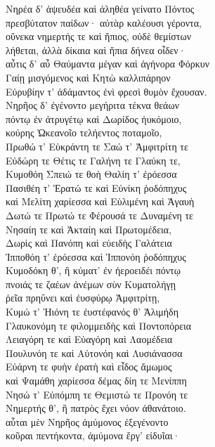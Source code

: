 \begin{pages}
\begin{Leftside}
Νηρέα δ' ἀψευδέα καὶ ἀληθέα γείνατο Πόντος \\
πρεσβύτατον παίδων· αὐτὰρ καλέουσι γέροντα, \\
οὕνεκα νημερτής τε καὶ ἤπιος, οὐδὲ θεμίστων \\
λήθεται, ἀλλὰ δίκαια καὶ ἤπια δήνεα οἶδεν· \\
αὖτις δ' αὖ Θαύμαντα μέγαν καὶ ἀγήνορα Φόρκυν\\
Γαίῃ μισγόμενος καὶ Κητὼ καλλιπάρηον \\
Εὐρυβίην τ' ἀδάμαντος ἐνὶ φρεσὶ θυμὸν ἔχουσαν.\\
Νηρῆος δ' ἐγένοντο μεγήριτα τέκνα θεάων \\
πόντῳ ἐν ἀτρυγέτῳ καὶ Δωρίδος ἠυκόμοιο,\\
κούρης Ὠκεανοῖο τελήεντος ποταμοῖο, \\
Πρωθώ τ' Εὐκράντη τε Σαώ τ' Ἀμφιτρίτη τε \\
Εὐδώρη τε Θέτις τε Γαλήνη τε Γλαύκη τε,\\
Κυμοθόη Σπειώ τε θοὴ Θαλίη τ' ἐρόεσσα \\
Πασιθέη τ' Ἐρατώ τε καὶ Εὐνίκη ῥοδόπηχυς\\
καὶ Μελίτη χαρίεσσα καὶ Εὐλιμένη καὶ Ἀγαυὴ\\
Δωτώ τε Πρωτώ τε Φέρουσά τε Δυναμένη τε\\
Νησαίη τε καὶ Ἀκταίη καὶ Πρωτομέδεια,\\
Δωρὶς καὶ Πανόπη καὶ εὐειδὴς Γαλάτεια  \\
Ἱπποθόη τ' ἐρόεσσα καὶ Ἱππονόη ῥοδόπηχυς\\
Κυμοδόκη θ', ἣ κύματ' ἐν ἠεροειδέι πόντῳ\\
πνοιάς τε ζαέων ἀνέμων σὺν Κυματολήγῃ\\
ῥεῖα πρηΰνει καὶ ἐυσφύρῳ Ἀμφιτρίτῃ,\\
Κυμώ τ' Ἠιόνη τε ἐυστέφανός θ' Ἁλιμήδη \\
Γλαυκονόμη τε φιλομμειδὴς καὶ Ποντοπόρεια\\
Λειαγόρη τε καὶ Εὐαγόρη καὶ Λαομέδεια \\
Πουλυνόη τε καὶ Αὐτονόη καὶ Λυσιάνασσα\\
Εὐάρνη τε φυὴν ἐρατὴ καὶ εἶδος ἄμωμος\\
καὶ Ψαμάθη χαρίεσσα δέμας δίη τε Μενίππη \\
Νησώ τ' Εὐπόμπη τε Θεμιστώ τε Προνόη τε\\
Νημερτής θ', ἣ πατρὸς ἔχει νόον ἀθανάτοιο.\\
αὗται μὲν Νηρῆος ἀμύμονος ἐξεγένοντο\\
κοῦραι πεντήκοντα, ἀμύμονα ἔργ' εἰδυῖαι· \\


\end{Leftside}
\end{pages}
